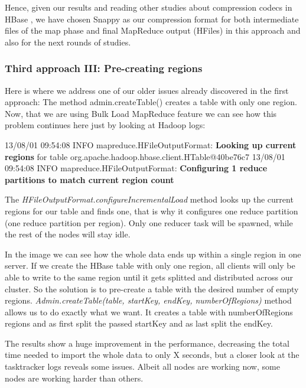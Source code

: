 Hence, given our results and reading other studies about compression codecs in HBase \cite{CompressionComparison}, we have chosen Snappy as our compression format for both intermediate files of the map phase and final MapReduce output (HFiles) in this approach and also for the next rounds of studies.




\subsubsection{Third approach III: Pre-creating regions}
Here is where we address one of our older issues already discovered in the first approach: The method admin.createTable() creates a table with only one region. Now, that we are using Bulk Load MapReduce feature we can see how this problem continues here just by looking at Hadoop logs:
\par
13/08/01 09:54:08 INFO mapreduce.HFileOutputFormat: \textbf{Looking up current regions} for table org.apache.hadoop.hbase.client.HTable@40be76c7
13/08/01 09:54:08 INFO mapreduce.HFileOutputFormat: \textbf{Configuring 1 reduce partitions to match current region count}
\par
The \textit{HFileOutputFormat.configureIncrementalLoad} method looks up the current regions for our table and finds one, that is why it configures one reduce partition (one reduce partition per region). Only one reducer task will be spawned, while the rest of the nodes will stay idle.
\par
{}
\par
In the image we can see how the whole data ends up within a single region in one server. If we create the HBase table with only one region, all clients will only be able to write to the same region until it gets splitted and distributed across our cluster. So the solution is to pre-create a table with the desired number of empty regions. \textit{Admin.createTable(table, startKey, endKey, numberOfRegions)} method allows us to do exactly what we want. It creates a table with numberOfRegions regions and as first split the passed startKey and as last split the endKey.
\par
{}
\par
The results show a huge improvement in the performance, decreasing the total time needed to import the whole data to only X seconds, but a closer look at the tasktracker logs reveals some issues. Albeit all nodes are working now, some nodes are working harder than others.
